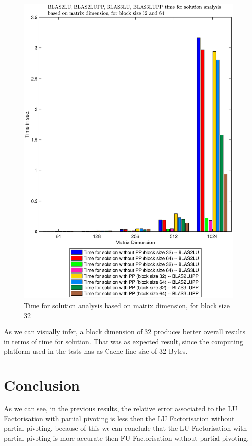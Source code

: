\documentclass[conference,compsoc]{IEEEtran}
\begin{document}
  \begin{figure}[H]
     \centering
     \includegraphics[width=1.1\columnwidth]{EPS/time_32vs64.eps}
     \caption{Time for solution analysis based on matrix dimension, for block size 32}\label{graph:time_32vs64}
     \end{figure}
     
     As we can visually infer, a block dimension of 32 produces better overall results in terms of time for solution. That was as expected result, since the computing platform used in the tests has as Cache line size of 32 Bytes.
  
\section{Conclusion}
As we can see, in the previous results, the relative error associated to the LU Factorisation with partial pivoting is less then the LU Factorisation without partial pivoting, because of this we can conclude that the LU Factorisation with partial pivoting is more accurate then FU Factorisation without partial pivoting.\par 
\end{document}

